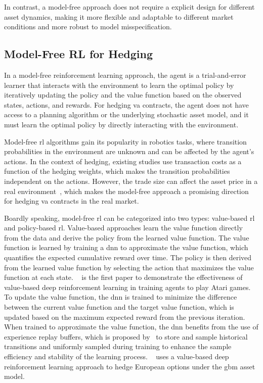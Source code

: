 In contrast, a model-free approach does not require a explicit design for different asset dynamics, making it more flexible and adaptable to different market conditions and more robust to model misspecification.

\subsection{Model-Free RL for Hedging}
    
In a model-free reinforcement learning approach, the agent is a trial-and-error learner that interacts with the environment to learn the optimal policy by iteratively updating the policy and the value function based on the observed states, actions, and rewards.
For hedging \gls{va} contracts, the agent does not have access to a planning algorithm or the underlying stochastic asset model, and it must learn the optimal policy by directly interacting with the environment.

Model-free \gls{rl} algorithms gain its popularity in robotics tasks, where transition probabilities in the environment are unknown and can be affected by the agent's actions.
In the context of hedging, existing studies use transaction costs as a function of the hedging weights, which makes the transition probabilities independent on the actions.
However, the trade size can affect the asset price in a real environment~\citep{hasbrouck1991measuring}, which makes the model-free approach a promising direction for hedging \gls{va} contracts in the real market.

Boardly speaking, model-free \gls{rl} can be categorized into two types: value-based \gls{rl} and policy-based \gls{rl}.
Value-based approaches learn the value function directly from the data and derive the policy from the learned value function. 
The value function is learned by training a \gls{dnn} to approximate the value function, which quantifies the expected cumulative reward over time. 
The policy is then derived from the learned value function by selecting the action that maximizes the value function at each state. 
~\cite{mnih2015human} is the first paper to demonstrate the effectiveness of value-based deep reinforcement learning in training agents to play Atari games.
To update the value function, the \gls{dnn} is trained to minimize the difference between the current value function and the target value function, which is updated based on the maximum expected reward from the previous iteration.
When trained to approximate the value function, the \gls{dnn} benefits from the use of experience replay buffers, which is proposed by~\cite{lin1992self} to store and sample historical transitions and uniformly sampled during training to enhance the sample efficiency and stability of the learning process.
~\cite{kolm2019dynamic} uses a value-based deep reinforcement learning approach to hedge European options under the \gls{gbm} asset model.

